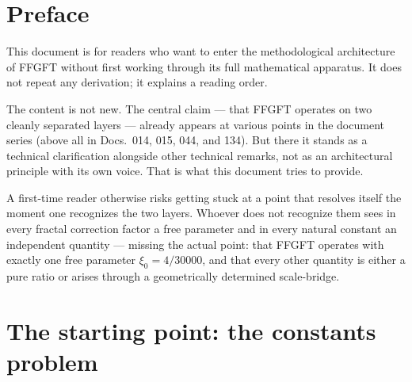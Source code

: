 
\section*{Preface}

This document is for readers who want to enter the methodological
architecture of FFGFT without first working through its full
mathematical apparatus. It does not repeat any derivation; it explains
a reading order.

The content is not new. The central claim --- that FFGFT operates on
two cleanly separated layers --- already appears at various points in
the document series (above all in Docs.~014, 015, 044, and 134). But
there it stands as a technical clarification alongside other technical
remarks, not as an architectural principle with its own voice. That is
what this document tries to provide.

A first-time reader otherwise risks getting stuck at a point that
resolves itself the moment one recognizes the two layers. Whoever does
not recognize them sees in every fractal correction factor a free
parameter and in every natural constant an independent quantity ---
missing the actual point: that FFGFT operates with exactly one free
parameter $\xi_{0} = 4/30000$, and that every other quantity is either
a pure ratio or arises through a geometrically determined scale-bridge.

\section{The starting point: the constants problem}

